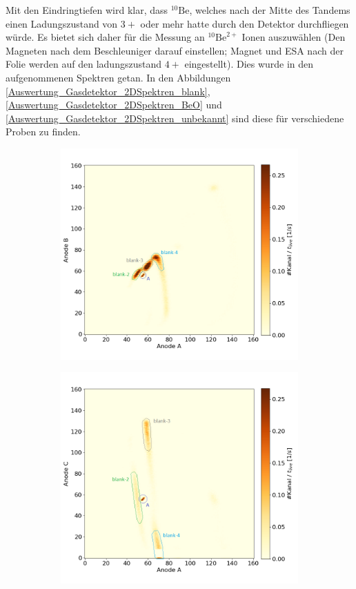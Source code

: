 Mit den Eindringtiefen wird klar, dass $^{10}\text{Be}$, welches nach der Mitte des Tandems einen Ladungszustand von $3+$ oder mehr hatte durch den Detektor durchfliegen würde.
Es bietet sich daher für die Messung an $^{10}\text{Be}^{2+}$ Ionen auszuwählen (Den Magneten nach dem Beschleuniger darauf einstellen; Magnet und ESA nach der Folie werden auf den ladungszustand $4+$ eingestellt).
Dies wurde in den aufgenommenen Spektren getan.
In den Abbildungen \ref{Auswertung_Gasdetektor_2DSpektren_blank}, \ref{Auswertung_Gasdetektor_2DSpektren_BeO} und \ref{Auswertung_Gasdetektor_2DSpektren_unbekannt} sind diese für verschiedene Proben zu finden.
\begin{figure}[H]
    \centering
    \begin{subfigure}{0.47\textwidth}
        \centering
        \includegraphics[width=\linewidth]{Pictures/Gasdetektor/3_blank_AB.png}
    \end{subfigure}
    \begin{subfigure}{0.47\textwidth}
        \centering
        \includegraphics[width=\linewidth]{Pictures/Gasdetektor/3_blank_AC.png}

\end{subfigure}
\end{figure}

